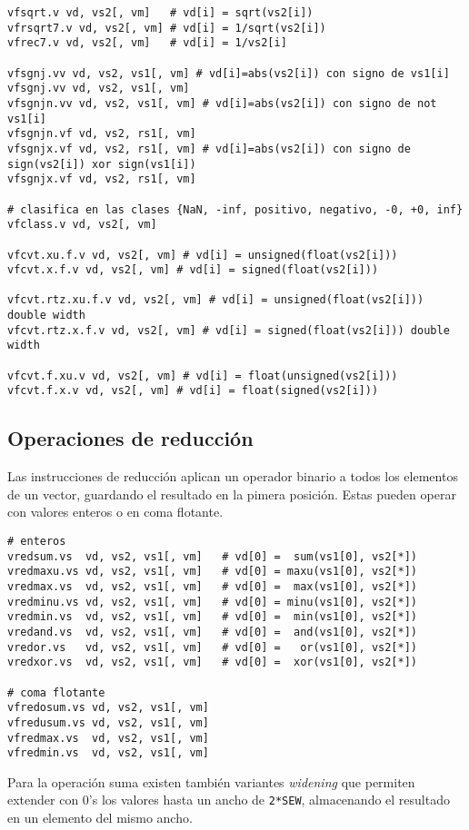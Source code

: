 \begin{lstlisting}
vfsqrt.v vd, vs2[, vm]   # vd[i] = sqrt(vs2[i])
vfrsqrt7.v vd, vs2[, vm] # vd[i] = 1/sqrt(vs2[i])
vfrec7.v vd, vs2[, vm]   # vd[i] = 1/vs2[i]

vfsgnj.vv vd, vs2, vs1[, vm] # vd[i]=abs(vs2[i]) con signo de vs1[i]
vfsgnj.vv vd, vs2, vs1[, vm]
vfsgnjn.vv vd, vs2, vs1[, vm] # vd[i]=abs(vs2[i]) con signo de not vs1[i]
vfsgnjn.vf vd, vs2, rs1[, vm]
vfsgnjx.vf vd, vs2, rs1[, vm] # vd[i]=abs(vs2[i]) con signo de sign(vs2[i]) xor sign(vs1[i])
vfsgnjx.vf vd, vs2, rs1[, vm]

# clasifica en las clases {NaN, -inf, positivo, negativo, -0, +0, inf}
vfclass.v vd, vs2[, vm] 

vfcvt.xu.f.v vd, vs2[, vm] # vd[i] = unsigned(float(vs2[i]))
vfcvt.x.f.v vd, vs2[, vm] # vd[i] = signed(float(vs2[i]))

vfcvt.rtz.xu.f.v vd, vs2[, vm] # vd[i] = unsigned(float(vs2[i])) double width
vfcvt.rtz.x.f.v vd, vs2[, vm] # vd[i] = signed(float(vs2[i])) double width

vfcvt.f.xu.v vd, vs2[, vm] # vd[i] = float(unsigned(vs2[i]))
vfcvt.f.x.v vd, vs2[, vm] # vd[i] = float(signed(vs2[i]))
\end{lstlisting}

\subsection{Operaciones de reducción}
Las instrucciones de reducción aplican un operador binario a todos los elementos de un vector, guardando el resultado en la pimera posición. Estas pueden operar con valores enteros o en coma flotante.

\begin{lstlisting}
# enteros
vredsum.vs  vd, vs2, vs1[, vm]   # vd[0] =  sum(vs1[0], vs2[*])
vredmaxu.vs vd, vs2, vs1[, vm]   # vd[0] = maxu(vs1[0], vs2[*])
vredmax.vs  vd, vs2, vs1[, vm]   # vd[0] =  max(vs1[0], vs2[*])
vredminu.vs vd, vs2, vs1[, vm]   # vd[0] = minu(vs1[0], vs2[*])
vredmin.vs  vd, vs2, vs1[, vm]   # vd[0] =  min(vs1[0], vs2[*])
vredand.vs  vd, vs2, vs1[, vm]   # vd[0] =  and(vs1[0], vs2[*])
vredor.vs   vd, vs2, vs1[, vm]   # vd[0] =   or(vs1[0], vs2[*])
vredxor.vs  vd, vs2, vs1[, vm]   # vd[0] =  xor(vs1[0], vs2[*])

# coma flotante
vfredosum.vs vd, vs2, vs1[, vm]
vfredusum.vs vd, vs2, vs1[, vm]
vfredmax.vs  vd, vs2, vs1[, vm]
vfredmin.vs  vd, vs2, vs1[, vm]
\end{lstlisting}
Para la operación suma existen también variantes \textit{widening} que permiten
extender con 0's los valores hasta un ancho de \texttt{2*SEW}, almacenando el
resultado en un elemento del mismo ancho.


